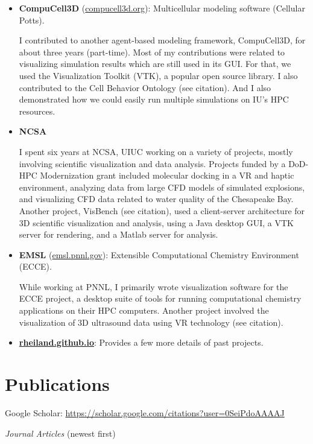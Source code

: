 \documentclass[11pt]{article}
\begin{document}
\begin{itemize}[leftmargin=*, itemsep=2pt, topsep=4pt]
    \item \textbf{CompuCell3D} (\href{https://compucell3d.org}{compucell3d.org}): Multicellular modeling software (Cellular Potts).
    
    I contributed to another agent-based modeling framework, CompuCell3D, for about three years (part-time). Most of my contributions were related to visualizing simulation results which are still used in its GUI. For that, we used the Visualization Toolkit (VTK), a popular open source library. I also contributed to the Cell Behavior Ontology (see citation). And I also demonstrated how we could easily run multiple simulations on IU's HPC resources.
    
    \item \textbf{NCSA}
    
    I spent six  years at NCSA, UIUC working on a variety of projects, mostly involving scientific visualization and data analysis. Projects funded by a DoD-HPC Modernization grant included molecular docking in a VR and haptic environment, analyzing data from large CFD models of simulated explosions, and visualizing CFD data related to water quality of the Chesapeake Bay.  Another project, VisBench (see citation), used a client-server architecture for 3D scientific visualization and analysis, using a Java desktop GUI, a VTK server for rendering, and a Matlab server for analysis.
    
    \item \textbf{EMSL} (\href{https://emsl.pnnl.gov}{emsl.pnnl.gov}): Extensible Computational Chemistry Environment (ECCE).
    
    While working at PNNL, I primarily wrote visualization software for the ECCE project, a desktop suite of tools for running computational chemistry applications on their HPC computers. Another project involved the visualization of 3D ultrasound data using VR technology (see citation).
    
    \item \textbf{\href{https://rheiland.github.io}{rheiland.github.io}}: Provides a few more details of past projects.
\end{itemize}

\section*{Publications}

Google Scholar: \url{https://scholar.google.com/citations?user=0SeiPdoAAAAJ}

\textit{Journal Articles} (newest first)
\end{document}
